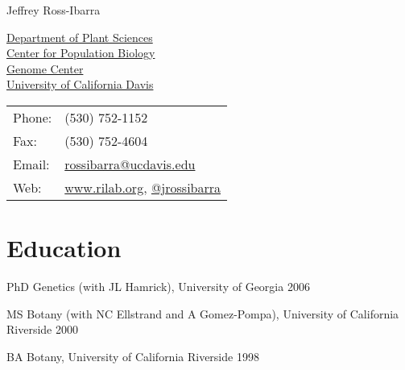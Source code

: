 \documentclass[letterpaper]{article}
\def\name{Jeffrey Ross-Ibarra}
\renewenvironment{itemize}{
  \begin{list}{}{
    \setlength{\leftmargin}{1.5em}
  }
}{
  \end{list}
}
\begin{document}
{\huge \name}


\vspace{0.25in}

\begin{minipage}{0.55\linewidth}
  \href{http://www.plantsciences.ucdavis.edu/plantsciences/}{Department of Plant Sciences}\\
  \href{http://cpb.ucdavis.edu/}{Center for Population Biology}\\
  \href{http://www.genomecenter.ucdavis.edu/}{Genome Center}\\
  \href{http://www.ucdavis.edu/}{University of California Davis} \\
\end{minipage}
\begin{minipage}{0.35\linewidth}
  \begin{tabular}{ll}
    Phone: & (530) 752-1152 \\
    Fax: &  (530) 752-4604 \\
    Email: & \href{mailto:rossibarra@ucdavis.edu}{rossibarra@ucdavis.edu} \\
    Web: & \href{http://www.rilab.org/}{www.rilab.org}, \href{http://www.twitter.com/jrossibarra/}{@jrossibarra} \\
  \end{tabular}
\end{minipage}

\section*{Education}
\begin{itemize}
 \item PhD Genetics (with JL Hamrick), University of Georgia 2006
  \item MS Botany (with NC Ellstrand and A Gomez-Pompa), University of California Riverside 2000 
 \item BA Botany, University of California Riverside 1998 
\end{itemize}

\end{document}

